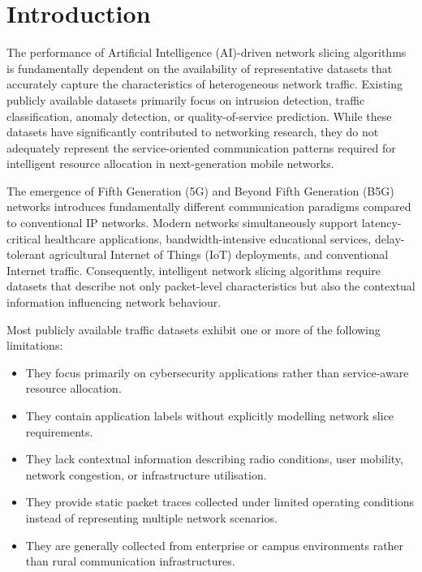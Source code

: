\documentclass[12pt,a4paper]{article}
\begin{document}
\section{Introduction}

The performance of Artificial Intelligence (AI)-driven network slicing algorithms is fundamentally dependent on the availability of representative datasets that accurately capture the characteristics of heterogeneous network traffic. Existing publicly available datasets primarily focus on intrusion detection, traffic classification, anomaly detection, or quality-of-service prediction. While these datasets have significantly contributed to networking research, they do not adequately represent the service-oriented communication patterns required for intelligent resource allocation in next-generation mobile networks.

The emergence of Fifth Generation (5G) and Beyond Fifth Generation (B5G) networks introduces fundamentally different communication paradigms compared to conventional IP networks. Modern networks simultaneously support latency-critical healthcare applications, bandwidth-intensive educational services, delay-tolerant agricultural Internet of Things (IoT) deployments, and conventional Internet traffic. Consequently, intelligent network slicing algorithms require datasets that describe not only packet-level characteristics but also the contextual information influencing network behaviour.

Most publicly available traffic datasets exhibit one or more of the following limitations:

\begin{itemize}
	
	\item They focus primarily on cybersecurity applications rather than service-aware resource allocation.
	
	\item They contain application labels without explicitly modelling network slice requirements.
	
	\item They lack contextual information describing radio conditions, user mobility, network congestion, or infrastructure utilisation.
	
	\item They provide static packet traces collected under limited operating conditions instead of representing multiple network scenarios.
	
	\item They are generally collected from enterprise or campus environments rather than rural communication infrastructures.
	
\end{itemize}
\end{document}
